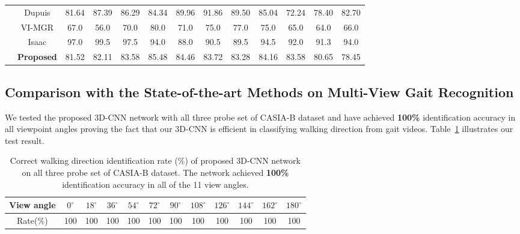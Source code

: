 \begin{table}
{\begin{tabular*}{\textwidth}{|c|c|cccc cccc ccc|}
		\multirow{4}{*}{\rotatebox{90}{Coat}} &Dupuis &81.64 &87.39 &86.29 &84.34 &89.96 &91.86 &89.50 &85.04 &72.24 &78.40 &82.70\\\rule{0pt}{3ex}
		
		&VI-MGR &67.0 &56.0 &70.0 &80.0 &71.0 &75.0 &77.0 &75.0 &65.0 &64.0 &66.0 \\\rule{0pt}{3ex}
		
		&Isaac &97.0 &99.5 &97.5 &94.0 &88.0 &90.5 &89.5 &94.5 &92.0 &91.3 &94.0 \\\rule{0pt}{3ex}
		
		&\textbf{Proposed} &81.52 &82.11 &83.58 &85.48 &84.46 &83.72 &83.28 &84.16 &83.58 &80.65 &78.45 \\\cline{1-13}
\end{tabular*}}{} 
\end{table}


\subsection{Comparison with the State-of-the-art Methods on Multi-View Gait Recognition}
We tested the proposed 3D-CNN network with all three probe set of CASIA-B dataset and have achieved \textbf{100\%} identification accuracy in all viewpoint angles proving the fact that our 3D-CNN is efficient in classifying walking direction from gait videos. Table~\ref{table:result_wd_identification} illustrates our test result. 


\begin{table}[t]
	\centering
	\caption{Correct walking direction identification rate (\%) of proposed 3D-CNN network on all three probe set of CASIA-B dataset. The network achieved \textbf{100\%} identification accuracy in all of the 11 view angles. \label{table:result_wd_identification}}
	{\begin{tabular*}{35pc}{cccc cccc cccc}\hline \noalign{\smallskip}
			View angle &${0^{\circ}}$	&${18^{\circ}}$  &${36^{\circ}}$ &${54^{\circ}}$	&${72^{\circ}}$	&${90^{\circ}}$	&${108^{\circ}}$ &${126^{\circ}}$ &${144^{\circ}}$ &${162^{\circ}}$  &${180^{\circ}}$ \\\hline \noalign{\smallskip}
			
			Rate(\%) &100 &100 &100 &100 &100 &100 &100 &100 &100 &100 &100 \\ \hline
	\end{tabular*}}{}
\end{table}

